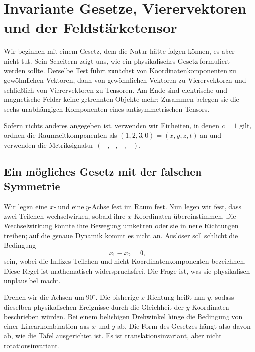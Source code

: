 \chapter{Invariante Gesetze, Vierervektoren und der Feldstärketensor}

Wir beginnen mit einem Gesetz, dem die Natur hätte folgen können, es aber nicht tut. Sein Scheitern zeigt uns, wie ein physikalisches Gesetz formuliert werden sollte. Derselbe Test führt zunächst von Koordinatenkomponenten zu gewöhnlichen Vektoren, dann von gewöhnlichen Vektoren zu Vierervektoren und schließlich von Vierervektoren zu Tensoren. Am Ende sind elektrische und magnetische Felder keine getrennten Objekte mehr: Zusammen belegen sie die sechs unabhängigen Komponenten eines antisymmetrischen Tensors.

Sofern nichts anderes angegeben ist, verwenden wir Einheiten, in denen \(c=1\) gilt, ordnen die Raumzeitkomponenten als \((1,2,3,0)=(x,y,z,t)\) an und verwenden die Metriksignatur \((-,-,-,+)\).

\section{Ein mögliches Gesetz mit der falschen Symmetrie}

Wir legen eine \(x\)- und eine \(y\)-Achse fest im Raum fest. Nun legen wir fest, dass zwei Teilchen wechselwirken, sobald ihre \(x\)-Koordinaten übereinstimmen. Die Wechselwirkung könnte ihre Bewegung umkehren oder sie in neue Richtungen treiben; auf die genaue Dynamik kommt es nicht an. Auslöser soll schlicht die Bedingung \begin{equation}
  x_1-x_2=0,
\end{equation} sein, wobei die Indizes Teilchen und nicht Koordinatenkomponenten bezeichnen. Diese Regel ist mathematisch widerspruchsfrei. Die Frage ist, was sie physikalisch unplausibel macht.

\begin{classroomqa}
\end{classroomqa}

Drehen wir die Achsen um \(90^\circ\). Die bisherige \(x\)-Richtung heißt nun \(y\), sodass dieselben physikalischen Ereignisse durch die Gleichheit der \(y\)-Koordinaten beschrieben würden. Bei einem beliebigen Drehwinkel hinge die Bedingung von einer Linearkombination aus \(x\) und \(y\) ab. Die Form des Gesetzes hängt also davon ab, wie die Tafel ausgerichtet ist. Es ist translationsinvariant, aber nicht rotationsinvariant.

